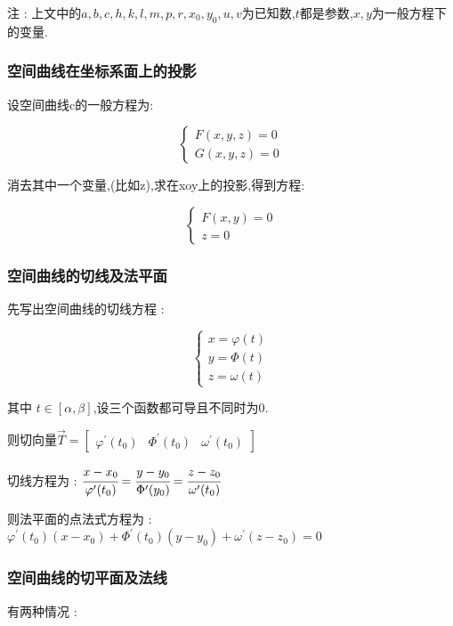 \documentclass[UTF8,12pt]{ctexbook}
\newcommand{\derivative}{^\prime}
\begin{document}
{{{{      注 : 上文中的$a,b,c,h,k,l,m,p,r,x_0,y_0,u,v$为已知数,$t$都是参数,$x,y$为一般方程下的变量.
    }%

    \subsubsection{空间曲线在坐标系面上的投影}{

      设空间曲线c的一般方程为:

      $$
        \begin{cases}
          F(x,y,z) = 0 \\
          G(x,y,z) = 0
        \end{cases}
      $$

      消去其中一个变量,(比如z),求在xoy上的投影,得到方程:

      $$
        \begin{cases}
          F(x,y) = 0 \\
          z = 0
        \end{cases}
      $$
    }%

    \subsubsection{空间曲线的切线及法平面}{
      先写出空间曲线的切线方程 :

      $$
        \begin{cases}
          x = \varphi(t) \\
          y = \Phi(t)    \\
          z = \omega(t)
        \end{cases}
      $$

      其中 $t \in [\alpha,\beta]$,设三个函数都可导且不同时为0.

      则切向量$\vec{T} = \begin{bmatrix}
          \varphi\derivative(t_0) & \Phi\derivative(t_0) & \omega\derivative(t_0)
        \end{bmatrix}$

      切线方程为 : $\cfrac{x - x_0}{\varphi\derivative(t_0)} = \cfrac{y - y_0}{\Phi\derivative(y_0)} = \cfrac{z - z_0}{\omega\derivative(t_0)}$

      则法平面的点法式方程为 : $\varphi\derivative(t_0)(x - x_0) + \Phi\derivative(t_0)(y - y_0) + \omega\derivative(z - z_0) = 0$
    }%

    \subsubsection{空间曲线的切平面及法线}{
      有两种情况 :

}}}}
\end{document}
